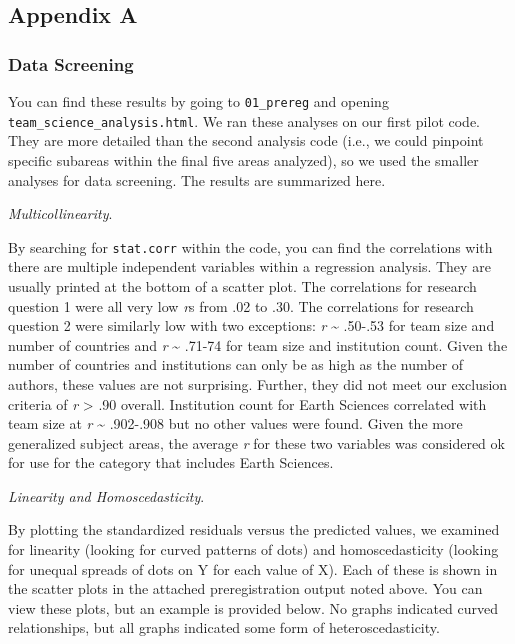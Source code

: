 \documentclass[
  man,floatsintext]{apa6}
\begin{document}
\newpage

\hypertarget{appendix-appendix}{%
\appendix}


\hypertarget{appendix-a}{%
\subsection{Appendix A}\label{appendix-a}}

\hypertarget{data-screening-1}{%
\subsubsection{Data Screening}\label{data-screening-1}}

You can find these results by going to \texttt{01\_prereg} and opening \texttt{team\_science\_analysis.html}. We ran these analyses on our first pilot code. They are more detailed than the second analysis code (i.e., we could pinpoint specific subareas within the final five areas analyzed), so we used the smaller analyses for data screening. The results are summarized here.

\emph{Multicollinearity}.

By searching for \texttt{stat.corr} within the code, you can find the correlations with there are multiple independent variables within a regression analysis. They are usually printed at the bottom of a scatter plot. The correlations for research question 1 were all very low \emph{r}s from .02 to .30. The correlations for research question 2 were similarly low with two exceptions: \emph{r} \textasciitilde{} .50-.53 for team size and number of countries and \emph{r} \textasciitilde{} .71-74 for team size and institution count. Given the number of countries and institutions can only be as high as the number of authors, these values are not surprising. Further, they did not meet our exclusion criteria of \emph{r} \textgreater{} .90 overall. Institution count for Earth Sciences correlated with team size at \emph{r} \textasciitilde{} .902-.908 but no other values were found. Given the more generalized subject areas, the average \emph{r} for these two variables was considered ok for use for the category that includes Earth Sciences.

\emph{Linearity and Homoscedasticity}.

By plotting the standardized residuals versus the predicted values, we examined for linearity (looking for curved patterns of dots) and homoscedasticity (looking for unequal spreads of dots on Y for each value of X). Each of these is shown in the scatter plots in the attached preregistration output noted above. You can view these plots, but an example is provided below. No graphs indicated curved relationships, but all graphs indicated some form of heteroscedasticity.
\end{document}
